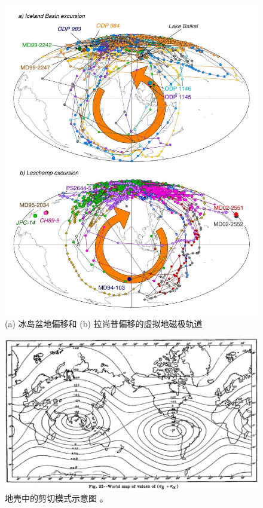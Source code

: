 \documentclass[10pt,twocolumn,letterpaper]{article}
\begin{document}
\begin{figure}[t]
\begin{center}
   \includegraphics[width=0.95\linewidth]{laj.jpg}
\end{center}
   \caption{(a) 冰岛盆地偏移和 (b) 拉尚普偏移的虚拟地磁极轨道 \cite{35}}
\label{fig:7}
\label{fig:onecol}
\end{figure}

\begin{figure}[t]
\begin{center}
   \includegraphics[width=1\linewidth]{meinesz3.jpg}
\end{center}
   \caption{地壳中的剪切模式示意图 \cite{36}。}
\label{fig:8}
\label{fig:onecol}
\end{figure}
\end{document}
